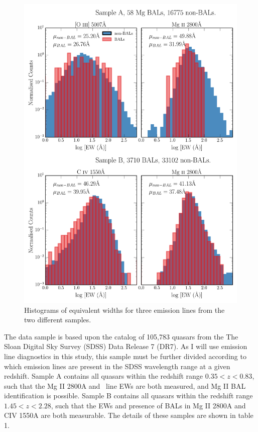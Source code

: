 \begin{figure} %
\centering
\includegraphics[width=1.0\textwidth]{figures/ewpaper/ew_hist_qsos.png}
\caption
{
Histograms of equivalent widths for three emission lines from the two different samples.
}
\label{fig:ew_hists}
\end{figure} %

The data sample is based upon the
\citet[][hereafter S11]{shen2011} catalog of
105,783 quasars from the The Sloan Digital Sky Survey (SDSS) 
Data Release 7 (DR7). 
As I will use emission line diagnostics in this study,
this sample must be further divided according to which 
emission lines are present in 
the SDSS wavelength range at a given redshift. 
Sample A contains all quasars within the redshift range $0.35<z<0.83$, 
such that the Mg II 2800A and \oiiifull\ line EWs are both measured, 
and Mg II BAL identification
is possible.  Sample B contains all quasars within the redshift 
range $1.45<z<2.28$, such that 
the EWs and presence of BALs in Mg II 2800A and CIV 1550A are both measurable.
The details of these samples are shown in table 1.

